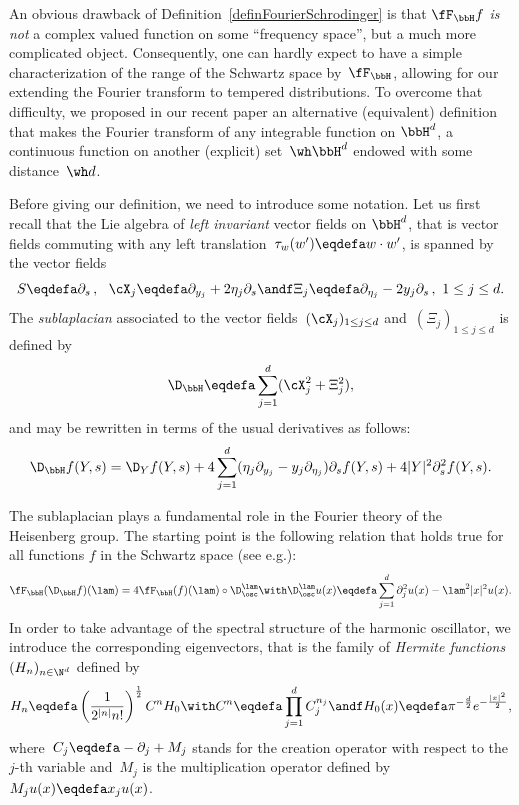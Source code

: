 An obvious drawback of Definition~\ref{definFourierSchrodinger} is that $\fF_\bbH f$ \emph{is not} a complex valued function on some ``frequency space'', but a much more complicated object. Consequently, one can hardly expect to have a simple characterization of the range of the Schwartz space by~$\fF_\bbH$, allowing for our extending the Fourier transform to tempered distributions. To overcome that difficulty, we proposed in our recent paper\cite{bcdFHspace} an alternative (equivalent) definition that makes the Fourier transform of any integrable function on $\bbH^d$, a continuous function on another (explicit) set~$\wh\bbH^d$ endowed with some distance~$\wh d$.

Before giving our definition, we need to introduce some notation. Let us first recall that the Lie algebra of \emph{left invariant} vector fields on $\bbH^d$, that is vector fields commuting with any left translation~$\tau_w(w') \eqdefa w\cdot w'$, is spanned by the vector fields
\begin{equation}\label{defleft}
S\eqdefa\partial_s\,,\ \ \cX_j\eqdefa\partial_{y_j} +2\eta_j\partial_s\andf \Xi_j\eqdefa \partial_{\eta_j} -2y_j\partial_s\,,\ 1\leq j\leq d.
\end{equation}
The \emph{sublaplacian} associated to the vector fields~$(\cX_j)_{1\leq j\leq d}$ and~$(\Xi_j)_{1\leq j\leq d}$ is defined by
\begin{equation}\label{defLaplace}
\D_{\bbH} \eqdefa \sum_{j=1} ^d (\cX_j^2+\Xi_j^2),
\end{equation}
and may be rewritten in terms of the usual derivatives as follows:
\[
\D_\bbH f(Y,s) = \D_{Y} f (Y,s) + 4\sum_{j=1} ^d (\eta_j \partial_{y_j} -y_j\partial_{\eta_j}) \partial_s f(Y,s) +4|Y|^2\partial_s^2 f(Y,s).
\]

The sublaplacian plays a fundamental role in the Fourier theory of the Heisenberg group. The starting point is the following relation that holds true for all functions $f$ in the Schwartz space (see e.g.\cite{huet, O}):
\begin{equation}\label{FourierEtLaplace}
\fF_{\bbH}(\D_\bbH f) (\lam) = 4\fF_{\bbH}(f)(\lam) \circ \D_{\osc} ^\lam \with \D_{\osc}^\lam u (x) \eqdefa\sum_{j=1}^d \partial_j^2 u(x) - \lam^2|x|^2 u(x).
\end{equation}
In order to take advantage of the spectral structure of the harmonic oscillator, we introduce the corresponding eigenvectors, that is the family of \emph{Hermite functions}~$(H_n)_{n\in\N^d}$ defined by
\[
H_n \eqdefa \left(\frac 1 {2^{|n|} n!}\right) ^{\frac 12}C^n H_0 \with C^n \eqdefa \prod_{j=1}^d C_j^{n_j}
\andf H_0(x)\eqdefa \pi^{-\frac d 2} e^{-\frac {|x|^2} 2},
\]
where~$C_j\eqdefa -\partial_j +M_j$ stands for the creation operator with respect to the $j$-th variable and~$M_j$ is the multiplication operator defined by~$M_ju(x)\eqdefa x_ju(x)$.

